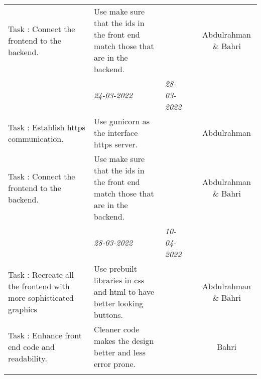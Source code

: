 \begin{center}
\begin{small}
\begin{xltabular}{\textwidth}{ p{3cm} p{5cm} X X c }
			Task \thesubcounter: 
			Connect the frontend to the backend.
			& Use make sure that the ids in the front end match those that are 
			in the backend.
			& & & Abdulrahman \& Bahri\\
			
			\addlinespace
			
			\addlinespace
			& \emph{24-03-2022} & \emph{28-03-2022} & 
			\\ \addlinespace
			
			Task \thesubcounter: 
			Establish https communication.
			& Use gunicorn as the interface https server.
			& & & Abdulrahman \\
			
			Task \thesubcounter: 
			Connect the frontend to the backend.
			& Use make sure that the ids in the front end match those that are 
			in the backend.
			& & & Abdulrahman \& Bahri\\
			
			\addlinespace
			
			
				\addlinespace
			
			\addlinespace
			& \emph{28-03-2022} & \emph{10-04-2022} & 
			\\ \addlinespace
			
			Task \thesubcounter: 
			Recreate all the frontend with more sophisticated graphics
			& Use prebuilt libraries in css and html to have better looking 
			buttons.
			& & & Abdulrahman \& Bahri\\
			
			Task \thesubcounter: 
			Enhance front end code and readability.
			& Cleaner code makes the design better and less error prone.
			& & & Bahri\\
			
			\addlinespace
			
			
			
			
			
			
			\bottomrule
		\end{xltabular}
	\end{small}
\end{center}
